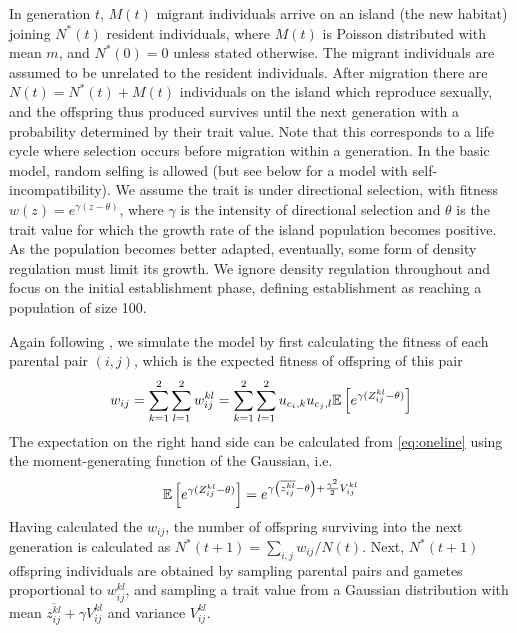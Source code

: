 \documentclass[12pt,a4paper]{article}
\begin{document}
    In generation $t$, $M(t)$ migrant individuals arrive on an island (the new
    habitat) joining $N^\ast(t)$ resident individuals, where $M(t)$ is Poisson
    distributed with mean $m$, and $N^\ast(0)=0$ unless stated otherwise. 
    The migrant individuals are assumed to be unrelated to the resident
    individuals.
    After migration there are $N(t) = N^\ast(t) + M(t)$ individuals on the island
    which reproduce sexually, and the offspring thus produced survives until the
    next generation with a probability determined by their trait value.
    Note that this corresponds to a life cycle where selection occurs before
    migration within a generation.
    In the basic model, random selfing is allowed (but see below for a model with
    self-incompatibility).
    We assume the trait is under directional selection, with fitness $w(z) =
    e^{\gamma(z - \theta)}$, where $\gamma$ is the intensity of directional
    selection and $\theta$ is the trait value for which the growth rate of the
    island population becomes positive.
    As the population becomes better adapted, eventually, some form of density
    regulation must limit its growth.
    We ignore density regulation throughout and focus on the initial establishment
    phase, defining establishment as reaching a population of size 100.

    Again following \cite{barton2018}, we simulate the model by first calculating
    the fitness of each parental pair $(i,j)$, which is the expected fitness of
    offspring of this pair
    \begin{equation}
      w_{ij}
        = \sum_{k=1}^2\sum_{l=1}^2 w_{ij}^{kl}
        = \sum_{k=1}^2\sum_{l=1}^2 u_{c_{i},k}u_{c_{j},l}
            \mathbb{E}\left[e^{\gamma(Z_{ij}^{kl} - \theta)}\right]
    \end{equation}
    The expectation on the right hand side can be calculated from \cref{eq:oneline}
    using the moment-generating function of the Gaussian, i.e.
    \begin{equation}
        \mathbb{E}\left[e^{\gamma(Z_{ij}^{kl} - \theta)}\right] 
        = e^{\gamma \left(\overline{z_{ij}^{kl}} -\theta\right) +
        \frac{\gamma^2}{2}
        V_{ij}^{kl}} 
        \label{eq:Ew}
    \end{equation}
    Having calculated the $w_{ij}$, the number of offspring surviving into the next
    generation is calculated as $N^\ast(t+1) = \sum_{i,j}w_{ij}/N(t)$.
    Next, $N^\ast(t+1)$ offspring individuals are obtained by sampling parental
    pairs and gametes proportional to $w_{ij}^{kl}$, and sampling a trait value
    from a Gaussian distribution with mean $\overline{z_{ij}^{kl}} + \gamma
    V_{ij}^{kl}$ and variance $V_{ij}^{kl}$. 
\end{document}
